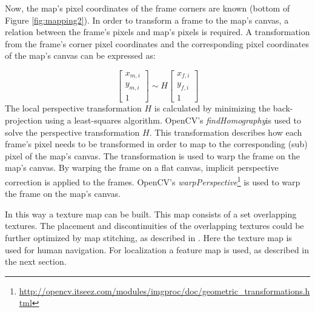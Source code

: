 Now, the map's pixel coordinates of the frame corners are known (bottom of Figure \ref{fig:mapping2}).
In order to transform a frame to the map's canvas, a relation between the frame's pixels and map's pixels is required.
A transformation from the frame's corner pixel coordinates and the corresponding pixel coordinates of the map's canvas can be expressed as:

\begin{equation}
\label{eq:visual-slam-perspective-transformation}
\left[ {
\begin{array}{c} x_{m,i} \\ y_{m,i} \\ 1 \end{array}
} \right]
\sim
H
\left[ {
\begin{array}{c} x_{f,i} \\ y_{f,i} \\ 1 \end{array}
} \right]
\end{equation}
The local perspective transformation $H$ is calculated by minimizing the back-projection using a least-squares algorithm.
OpenCV's \textit{findHomography}\footnotemark[3] is used to solve the perspective transformation $H$.
This transformation describes how each frame's pixel needs to be transformed in order to map to the corresponding (sub) pixel of the map's canvas.
The transformation is used to warp the frame on the map's canvas.
By warping the frame on a flat canvas, implicit perspective correction is applied to the frames.
OpenCV's \textit{warpPerspective}\footnote{\url{http://opencv.itseez.com/modules/imgproc/doc/geometric_transformations.html}} is used to warp the frame on the map's canvas.

In this way a texture map can be built. This map consists of a set overlapping textures. The placement and discontinuities of the overlapping textures could be further optimized by map stitching, as described in \cite{Visser2011imav}. Here the texture map is used for human navigation.
For
localization a feature map is used, as described in the next section.



